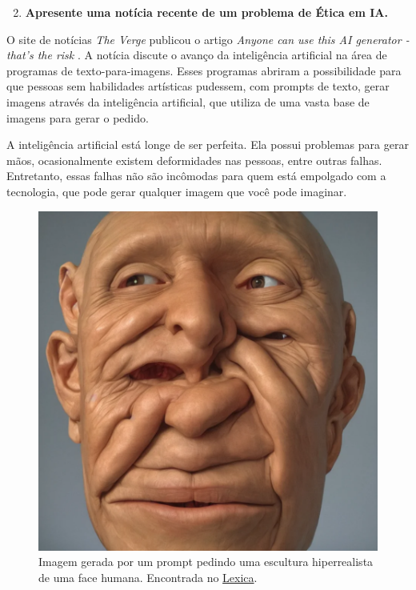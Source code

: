 \begin{enumerate}\setcounter{enumi}{1}\bfseries
    \item \textbf{Apresente uma notícia recente de um problema de Ética em IA.}
\end{enumerate}

O site de notícias \textit{The Verge} publicou o artigo \textit{Anyone can use this AI generator - that's the risk} \cite{verge_ai_generator}. A notícia discute o avanço da inteligência artificial na área de programas de texto-para-imagens. Esses programas abriram a possibilidade para que pessoas sem habilidades artísticas pudessem, com prompts de texto, gerar imagens através da inteligência artificial, que utiliza de uma vasta base de imagens para gerar o pedido.

A inteligência artificial está longe de ser perfeita. Ela possui problemas para gerar mãos, ocasionalmente existem deformidades nas pessoas, entre outras falhas. Entretanto, essas falhas não são incômodas para quem está empolgado com a tecnologia, que pode gerar qualquer imagem que você pode imaginar.

\begin{figure}[h]
\centering
\includegraphics[scale=0.15]{face_deformada.png}
\caption{Imagem gerada por um prompt pedindo uma escultura hiperrealista de uma face humana. Encontrada no \href{https://lexica.art/prompt/10023e09-97d2-4ba3-8e01-4ee149a42c6f}{Lexica}.}
\end{figure}


